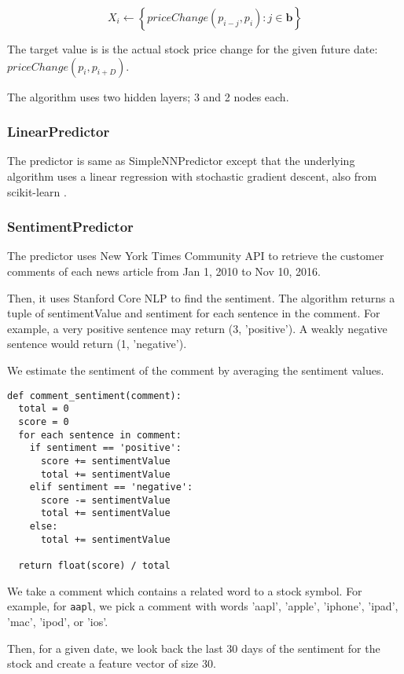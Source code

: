 \documentclass[twocolumn,10pt]{asme2ej}
\newcommand{\vect}[1]{\boldsymbol{#1}}
\begin{document}
\[
X_i \gets \left\{priceChange(p_{i - j}, p_i) : j \in \vect{b}\right\}
\]

The target value is is the actual stock price change for the given
future date: $priceChange(p_i, p_{i+D})$.

The algorithm uses two hidden layers; 3 and 2 nodes each.

\subsubsection{LinearPredictor}
The predictor is same as SimpleNNPredictor except that the underlying
algorithm uses a linear regression with stochastic gradient descent,
also from scikit-learn \cite{web:scikit_learn}.

\subsubsection{SentimentPredictor}

The predictor uses New York Times Community API
\cite{web:nytimes_community_api} to retrieve the customer comments of
each news article from Jan 1, 2010 to Nov 10, 2016.

Then, it uses Stanford Core NLP \cite{manning-EtAl:2014:P14-5} to find
the sentiment. The algorithm returns a tuple of sentimentValue and
sentiment for each sentence in the comment. For example, a very
positive sentence may return (3, 'positive'). A weakly negative
sentence would return (1, 'negative').

We estimate the sentiment of the comment by averaging the sentiment
values.

\begin{verbatim}
def comment_sentiment(comment):
  total = 0
  score = 0
  for each sentence in comment:
    if sentiment == 'positive':
      score += sentimentValue
      total += sentimentValue
    elif sentiment == 'negative':
      score -= sentimentValue
      total += sentimentValue
    else:
      total += sentimentValue

  return float(score) / total
\end{verbatim}

We take a comment which contains a related word to a stock symbol. For
example, for \verb|aapl|, we pick a comment with words 'aapl',
'apple', 'iphone', 'ipad', 'mac', 'ipod', or 'ios'.

Then, for a given date, we look back the last 30 days of the sentiment
for the stock and create a feature vector of size 30.
\end{document}
